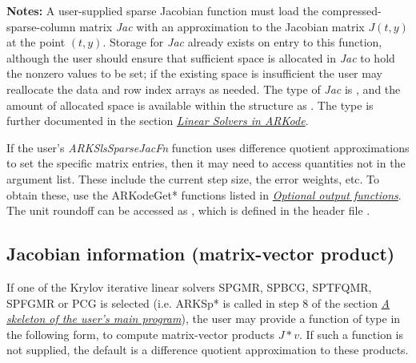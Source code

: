 \documentclass[letterpaper,10pt,english]{sphinxmanual}
\begin{document}
\begin{fulllineitems}
\textbf{Notes:} A user-supplied sparse Jacobian function must load the
compressed-sparse-column matrix \emph{Jac} with an approximation to the
Jacobian matrix $J(t,y)$ at the point $(t,y)$.  Storage
for \emph{Jac} already exists on entry to this function, although the
user should ensure that sufficient space is allocated in \emph{Jac} to
hold the nonzero values to be set; if the existing space is
insufficient the user may reallocate the data and row index arrays
as needed.  The type of \emph{Jac} is , and the amount of
allocated space is available within the  structure as
. The  type is further documented in the section
{\hyperref[linear_solvers/index:linearsolvers]{\emph{Linear Solvers in ARKode}}}.

If the user's \emph{ARKSlsSparseJacFn} function uses difference quotient
approximations to set the specific matrix entries, then it may need
to access quantities not in the argument list.  These include the
current step size, the error weights, etc.  To obtain these, use
the ARKodeGet* functions listed in
{\hyperref[c_interface/User_callable:cinterface-optionaloutputs]{\emph{Optional output functions}}}. The unit roundoff can be
accessed as , which is defined in the header file
.

\end{fulllineitems}



\subsection{Jacobian information (matrix-vector product)}
\label{c_interface/User_supplied:cinterface-jtimesfn}\label{c_interface/User_supplied:jacobian-information-matrix-vector-product}
If one of the Krylov iterative linear solvers SPGMR, SPBCG, SPTFQMR,
SPFGMR or PCG is selected (i.e. ARKSp* is called in step 8 of the
section {\hyperref[c_interface/Skeleton:cinterface-skeleton]{\emph{A skeleton of the user's main program}}}), the user may provide a function
of type {\hyperref[c_interface/User_supplied:ARKSpilsJacTimesVecFn]{}} in the following form, to
compute matrix-vector products $J*v$. If such a function is not
supplied, the default is a difference quotient approximation to these
products.
\end{document}
